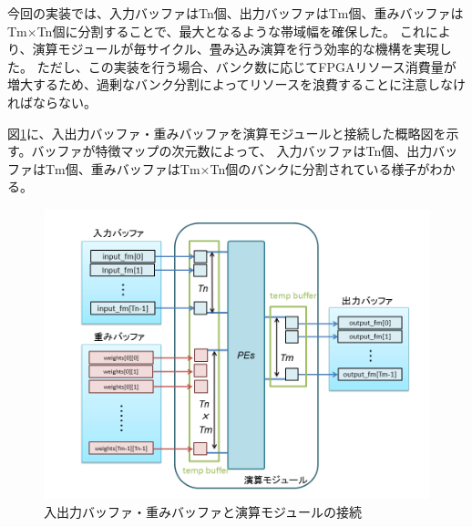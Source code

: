 今回の実装では、入力バッファはTn個、出力バッファはTm個、重みバッファはTm×Tn個に分割することで、最大となるような帯域幅を確保した。
これにより、演算モジュールが毎サイクル、畳み込み演算を行う効率的な機構を実現した。
ただし、この実装を行う場合、バンク数に応じてFPGAリソース消費量が増大するため、過剰なバンク分割によってリソースを浪費することに注意しなければならない。

図\ref{fig_buffer}に、入出力バッファ・重みバッファを演算モジュールと接続した概略図を示す。バッファが特徴マップの次元数によって、
入力バッファはTn個、出力バッファはTm個、重みバッファはTm×Tn個のバンクに分割されている様子がわかる。

\begin{figure}[ht]  
 \begin{center}   
   \includegraphics[width=1.0\columnwidth, bb=0 0 720 540]{img/buffer.png}
  \caption{入出力バッファ・重みバッファと演算モジュールの接続}
  \label{fig_buffer}  
 \end{center}  
\end{figure}